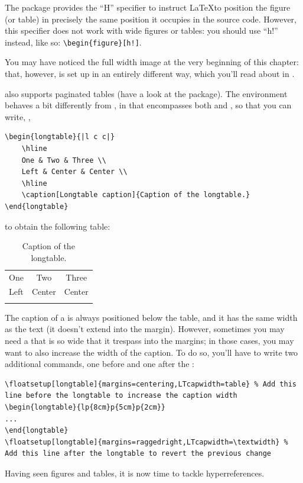 The  package provides the \enquote{H} specifier to 
instruct \LaTeX to position the figure (or table) in precisely the same 
position it occupies in the source code. However, this specifier does 
not work with wide figures or tables: you should use \enquote{h!} 
instead, like so: \lstinline|\begin{figure}[h!]|.

You may have noticed the full width image at the very beginning of this
chapter: that, however, is set up in an entirely different way, which
you'll read about in .

 also supports paginated tables (have a look at the 
 package). The 
 environment behaves a bit differently from 
, in that  encompasses both 
 and , so that you can write, 
\eg,

\begin{lstlisting}[caption=Example of a longtable]
\begin{longtable}{|l c c|}
    \hline
    One & Two & Three \\
    Left & Center & Center \\
    \hline
    \caption[Longtable caption]{Caption of the longtable.}
\end{longtable}
\end{lstlisting}

to obtain the following table:
\begin{longtable}{|l c c|}
    \hline
    One & Two & Three \\
    Left & Center & Center \\
    \hline
    \caption[Longtable caption]{Caption of the longtable.}
\end{longtable}

The caption of a  is always positioned below the 
table, and it has the same width as the text (it doesn't extend into the 
margin). However, sometimes you may need a  that 
is so wide that it trespass into the margins; in those cases, you may 
want to also increase the width of the caption. To do so, you'll have to 
write two additional commands, one before and one after the 
:

\begin{lstlisting}[caption=Increasing the width of the caption of a \Environment{longtable}.]
\floatsetup[longtable]{margins=centering,LTcapwidth=table} % Add this line before the longtable to increase the caption width
\begin{longtable}{lp{8cm}p{5cm}p{2cm}}
...
\end{longtable}
\floatsetup[longtable]{margins=raggedright,LTcapwidth=\textwidth} % Add this line after the longtable to revert the previous change
\end{lstlisting}

Having seen figures and tables, it is now time to tackle 
hyperreferences.
